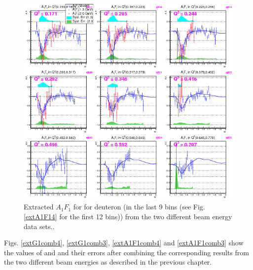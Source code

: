 \begin{figure}[H] %
  \leavevmode \includegraphics[width=1.0\textwidth]{figuresEG4/FigResults/extractedFrmBothEb_A1F1_C71S181NoQeWbins70LessQ2binsNwPd3.png} 
  \caption[Extracted $A_1 F_1$ in the next 9 \qsqs bins]{Extracted $A_1 F_1$ for for deuteron (in the last 9 \qsqs bins (see Fig. \ref{extA1F14} for the first 12 bins)) from the two different beam energy data sets..}
  \label{extA1F13}  
\end{figure}










Figs. \ref{extG1comb4}, \ref{extG1comb3}, \ref{extA1F1comb4} and \ref{extA1F1comb3} show the values of \gone and \afone and their errors after combining the corresponding results %
from the two different beam energies as described in the previous chapter. 



